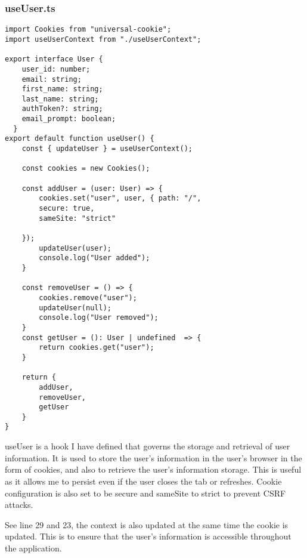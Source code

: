 \subsubsection{useUser.ts}
\begin{verbatim}
import Cookies from "universal-cookie";
import useUserContext from "./useUserContext";

export interface User {
    user_id: number;
    email: string;
    first_name: string;
    last_name: string;
    authToken?: string;
    email_prompt: boolean;
  }
export default function useUser() {
    const { updateUser } = useUserContext();

    const cookies = new Cookies();

    const addUser = (user: User) => {
        cookies.set("user", user, { path: "/",
        secure: true,
        sameSite: "strict"

    });
        updateUser(user);
        console.log("User added");
    }

    const removeUser = () => {
        cookies.remove("user");
        updateUser(null);
        console.log("User removed");
    }
    const getUser = (): User | undefined  => {
        return cookies.get("user");
    }

    return {
        addUser,
        removeUser,
        getUser
    }
}
\end{verbatim}
useUser is a hook I have defined that governs the storage and retrieval of user information. It is used to store the user's information in the user's browser in the form of cookies, and also to retrieve the user's information storage. This is useful as it allows me to persist even if the user closes the tab or refreshes. Cookie configuration is also set to be secure and sameSite to strict to prevent CSRF attacks.

See line 29 and 23, the context is also updated at the same time the cookie is updated. This is to ensure that the user's information is accessible throughout the application.


